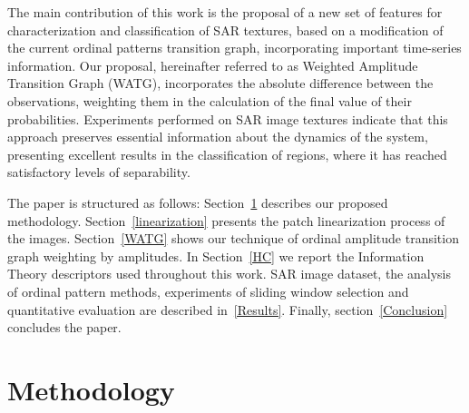 \documentclass[journal]{IEEEtran}
\begin{document}
The main contribution of this work is the proposal of a new set of features for characterization and classification of SAR textures, based on a modification of the current ordinal patterns transition graph, incorporating important time-series information.
Our proposal, hereinafter referred to as Weighted Amplitude Transition Graph (WATG), incorporates the absolute difference between the observations, weighting them in the calculation of the final value of their probabilities.
Experiments performed on SAR image textures indicate that this approach preserves essential information about the dynamics of the system, presenting excellent results in the classification of regions, where it has reached satisfactory levels of separability.


The paper is structured as follows:
Section~\ref{methodology} describes our proposed methodology.
Section~\ref{linearization} presents the patch linearization process of the images.
Section~\ref{WATG} shows our technique of ordinal amplitude transition graph weighting by amplitudes.
In Section~\ref{HC} we report the Information Theory descriptors used throughout this work.
SAR image dataset, the analysis of ordinal pattern methods, experiments of sliding window selection and quantitative evaluation are described in~\ref{Results}.
Finally, section~\ref{Conclusion} concludes the paper.


\section{Methodology}\label{methodology}
\end{document}

